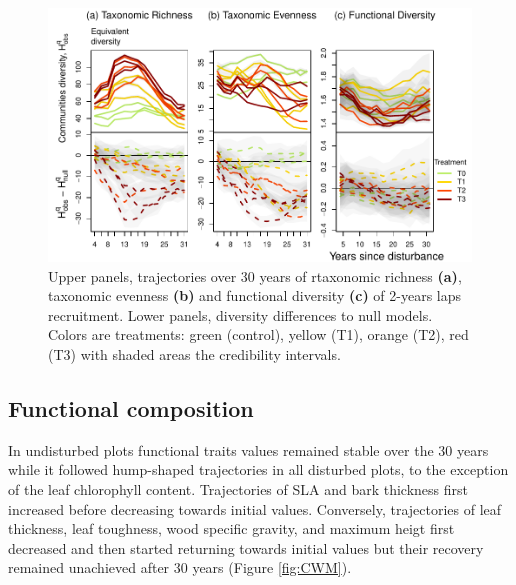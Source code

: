 \documentclass[fleqn,10pt]{ArtEcoFoG} %
\begin{document}
\begin{figure}

{\centering \includegraphics{RecruitmentTrajectories_files/figure-latex/DivTraj-1} 

}

\caption{Upper panels, trajectories over 30 years of rtaxonomic richness \textbf{(a)}, taxonomic evenness \textbf{(b)} and functional diversity \textbf{(c)} of 2-years laps recruitment. Lower panels, diversity differences to null models. Colors are treatments: green (control), yellow (T1), orange (T2), red (T3) with shaded areas the credibility intervals.}\label{fig:DivTraj}
\end{figure}

\subsection{Functional composition}\label{functional-composition}

In undisturbed plots functional traits values remained stable over the
30 years while it followed hump-shaped trajectories in all disturbed
plots, to the exception of the leaf chlorophyll content. Trajectories of
SLA and bark thickness first increased before decreasing towards initial
values. Conversely, trajectories of leaf thickness, leaf toughness, wood
specific gravity, and maximum heigt first decreased and then started
returning towards initial values but their recovery remained unachieved
after 30 years (Figure \ref{fig:CWM}).
\end{document}
